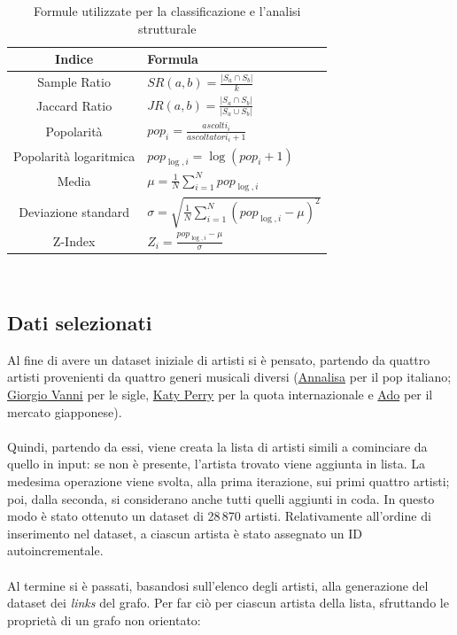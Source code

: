 \documentclass[sigchi]{acmart}
\begin{document}
\begin{table}[H]
\centering
\begin{tabular}{|c|>{\centering\arraybackslash}p{4cm}|}
\hline
\textbf{Indice} & \textbf{Formula} \\
\hline
Sample Ratio &
$SR(a, b) = \frac{|S_a \cap S_b|}{k}$ \\
\hline
Jaccard Ratio &
$JR(a, b) = \frac{|S_a \cap S_b|}{|S_a \cup S_b|}$ \\
\hline
Popolarità &
$pop_i = \frac{ascolti_i}{ascoltatori_i + 1}$ \\
\hline
Popolarità logaritmica &
$pop_{\log,i} = \log(pop_i + 1)$ \\
\hline
Media &
$\mu = \frac{1}{N} \sum_{i=1}^{N} pop_{\log,i}$ \\
\hline
Deviazione standard &
$\sigma = \sqrt{\frac{1}{N} \sum_{i=1}^{N} (pop_{\log,i} - \mu)^2}$ \\
\hline
Z-Index &
$Z_i = \frac{pop_{\log,i} - \mu}{\sigma}$ \\
\hline
\end{tabular}\\[15pt]
\caption{Formule utilizzate per la classificazione e l'analisi strutturale}
\end{table}


\subsection{Dati selezionati}

Al fine di avere un dataset iniziale di artisti si è pensato, partendo da quattro artisti provenienti da quattro generi musicali diversi (\href{https://www.last.fm/music/Annalisa}{Annalisa} per il pop italiano; \href{https://www.last.fm/music/Giorgio+Vanni}{Giorgio Vanni} per le sigle, \href{https://www.last.fm/music/Katy+Perry}{Katy Perry} per la quota internazionale e \href{https://www.last.fm/music/Ado}{Ado} per il mercato giapponese). \\ \\ Quindi, partendo da essi, viene creata la lista di artisti simili a cominciare da quello in input: se non è presente, l'artista trovato viene aggiunta in lista. La medesima operazione viene svolta, alla prima iterazione, sui primi quattro artisti; poi, dalla seconda, si considerano anche tutti quelli aggiunti in coda. In questo modo è stato ottenuto un dataset di 28\,870 artisti. Relativamente all'ordine di inserimento nel dataset, a ciascun artista è stato assegnato un ID autoincrementale. \\ \\ Al termine si è passati, basandosi sull'elenco degli artisti, alla generazione del dataset dei {\itshape links} del grafo. Per far ciò per ciascun artista della lista, sfruttando le proprietà di un grafo non orientato:
\end{document}
